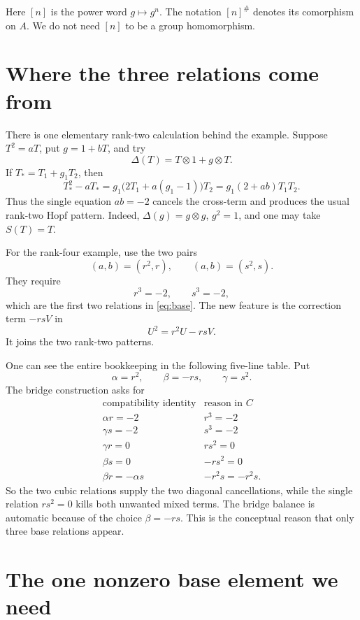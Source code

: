 \documentclass[11pt]{article}
\newcommand{\ot}{\otimes}
\theoremstyle{remark}
\begin{document}
Here \([n]\) is the power word \(g\mapsto g^n\).  The notation
\([n]^\#\) denotes its comorphism on \(A\).  We do not need \([n]\) to be a
group homomorphism.

\section{Where the three relations come from}

There is one elementary rank-two calculation behind the example.  Suppose
\(T^2=aT\), put \(g=1+bT\), and try
\[
 \Delta(T)=T\ot1+g\ot T.
\]
If \(T_*=T_1+g_1T_2\), then
\begin{equation}\label{eq:rank2}
 T_*^2-aT_*
 =g_1\bigl(2T_1+a(g_1-1)\bigr)T_2
 =g_1(2+ab)T_1T_2.
\end{equation}
Thus the single equation \(ab=-2\) cancels the cross-term and produces the
usual rank-two Hopf pattern.  Indeed,
\(\Delta(g)=g\ot g\), \(g^2=1\), and one may take \(S(T)=T\).

For the rank-four example, use the two pairs
\[
 (a,b)=(r^2,r),
 \qquad
 (a,b)=(s^2,s).
\]
They require
\[
 r^3=-2,\qquad s^3=-2,
\]
which are the first two relations in \eqref{eq:base}.  The new feature is
the correction term \(-rsV\) in
\[
 U^2=r^2U-rsV.
\]
It joins the two rank-two patterns.

One can see the entire bookkeeping in the following five-line table.  Put
\[
 \alpha=r^2,\qquad \beta=-rs,\qquad \gamma=s^2.
\]
The bridge construction asks for
\begin{equation}\label{eq:five-checks}
\begin{array}{c|c}
\text{compatibility identity}&\text{reason in \(C\)}\\ \hline
\alpha r=-2&r^3=-2\\
\gamma s=-2&s^3=-2\\
\gamma r=0&rs^2=0\\
\beta s=0&-rs^2=0\\
\beta r=-\alpha s&-r^2s=-r^2s.
\end{array}
\end{equation}
So the two cubic relations supply the two diagonal cancellations, while
the single relation \(rs^2=0\) kills both unwanted mixed terms.  The bridge
balance is automatic because of the choice \(\beta=-rs\).  This is the
conceptual reason that only three base relations appear.

\section{The one nonzero base element we need}
\end{document}
